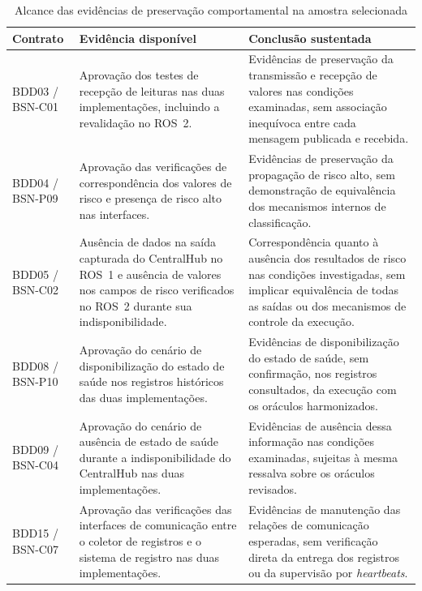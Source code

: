 \begin{table}[htbp]
\centering
\caption{Alcance das evidências de preservação comportamental na amostra selecionada}
\label{tab:avaliacao-rq2-contratos}
\small
\begin{tabularx}{\textwidth}{@{}p{}XX@{}}
\toprule
\textbf{Contrato} & \textbf{Evidência disponível} & \textbf{Conclusão sustentada} \\
\midrule
BDD03 / BSN-C01 &
Aprovação dos testes de recepção de leituras nas duas implementações, incluindo a revalidação no ROS~2. &
Evidências de preservação da transmissão e recepção de valores nas condições examinadas, sem associação inequívoca entre cada mensagem publicada e recebida. \\
\addlinespace
BDD04 / BSN-P09 &
Aprovação das verificações de correspondência dos valores de risco e presença de risco alto nas interfaces. &
Evidências de preservação da propagação de risco alto, sem demonstração de equivalência dos mecanismos internos de classificação. \\
\addlinespace
BDD05 / BSN-C02 &
Ausência de dados na saída capturada do CentralHub no ROS~1 e ausência de valores nos campos de risco verificados no ROS~2 durante sua indisponibilidade. &
Correspondência quanto à ausência dos resultados de risco nas condições investigadas, sem implicar equivalência de todas as saídas ou dos mecanismos de controle da execução. \\
\addlinespace
BDD08 / BSN-P10 &
Aprovação do cenário de disponibilização do estado de saúde nos registros históricos das duas implementações. &
Evidências de disponibilização do estado de saúde, sem confirmação, nos registros consultados, da execução com os oráculos harmonizados. \\
\addlinespace
BDD09 / BSN-C04 &
Aprovação do cenário de ausência de estado de saúde durante a indisponibilidade do CentralHub nas duas implementações. &
Evidências de ausência dessa informação nas condições examinadas, sujeitas à mesma ressalva sobre os oráculos revisados. \\
\addlinespace
BDD15 / BSN-C07 &
Aprovação das verificações das interfaces de comunicação entre o coletor de registros e o sistema de registro nas duas implementações. &
Evidências de manutenção das relações de comunicação esperadas, sem verificação direta da entrega dos registros ou da supervisão por \textit{heartbeats}. \\
\bottomrule
\end{tabularx}
\end{table}

